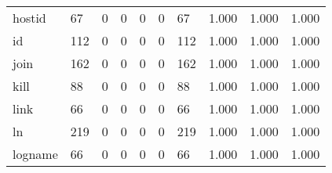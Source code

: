\begin{longtable}{lp{2.0cm}p{2.0cm}p{2.0cm}p{2.0cm}p{2.0cm}p{2.0cm}p{2.0cm}p{2.0cm}p{2.0cm}}
hostid    &                     67 &                                             0 &                                            0 &                                           0 &                                            0 &                                         67 &                                1.000 &                                  1.000 &                                1.000 \\
id        &                    112 &                                             0 &                                            0 &                                           0 &                                            0 &                                        112 &                                1.000 &                                  1.000 &                                1.000 \\
join      &                    162 &                                             0 &                                            0 &                                           0 &                                            0 &                                        162 &                                1.000 &                                  1.000 &                                1.000 \\
kill      &                     88 &                                             0 &                                            0 &                                           0 &                                            0 &                                         88 &                                1.000 &                                  1.000 &                                1.000 \\
link      &                     66 &                                             0 &                                            0 &                                           0 &                                            0 &                                         66 &                                1.000 &                                  1.000 &                                1.000 \\
ln        &                    219 &                                             0 &                                            0 &                                           0 &                                            0 &                                        219 &                                1.000 &                                  1.000 &                                1.000 \\
logname   &                     66 &                                             0 &                                            0 &                                           0 &                                            0 &                                         66 &                                1.000 &                                  1.000 &                                1.000 \\

\end{longtable}
